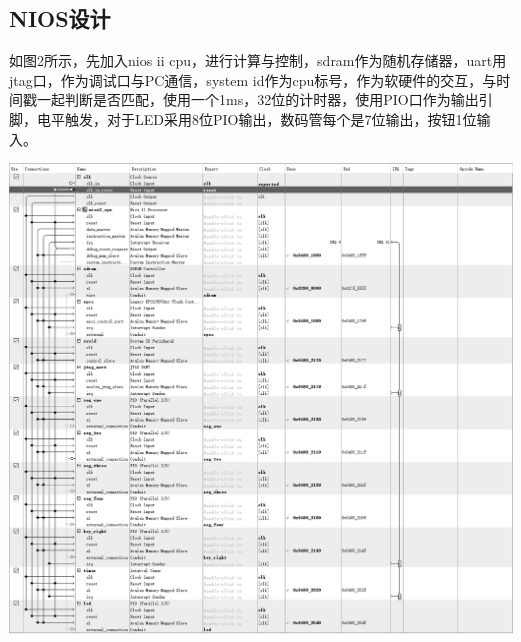 \documentclass[UTF8]{ctexart}
\makeatletter
\newcommand{\figcaption}{\def\@captype{figure}\caption}
\makeatother
\begin{document}
\subsection{NIOS设计}
如图2所示，先加入nios ii cpu，进行计算与控制，sdram作为随机存储器，uart用jtag口，作为调试口与PC通信，system id作为cpu标号，作为软硬件的交互，与时间戳一起判断是否匹配，使用一个1ms，32位的计时器，使用PIO口作为输出引脚，电平触发，对于LED采用8位PIO输出，数码管每个是7位输出，按钮1位输入。
	\begin{center}
		\includegraphics[width=16cm]{nios2.eps}
		\figcaption{NIOS II设计}\label{nios.eps}
	\end{center}
\end{document}

